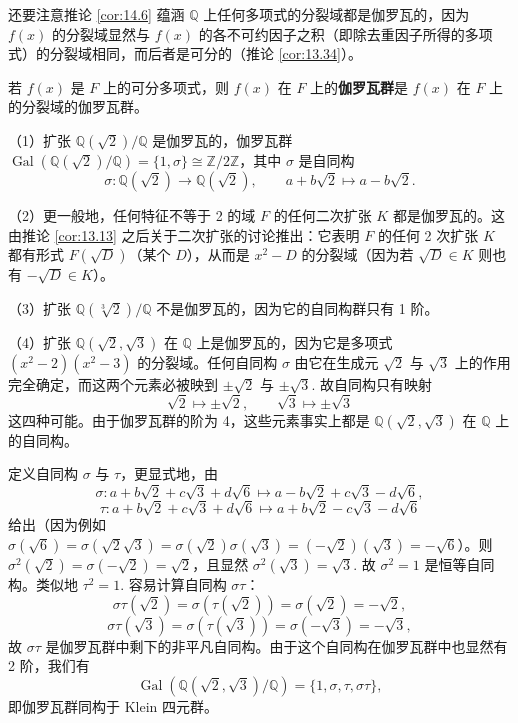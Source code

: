 还要注意推论 \ref{cor:14.6} 蕴涵 \(\mathbb{Q}\) 上任何多项式的分裂域都是伽罗瓦的，因为 \(f(x)\) 的分裂域显然与 \(f(x)\) 的各不可约因子之积（即除去重因子所得的多项式）的分裂域相同，而后者是可分的（推论 \ref{cor:13.34}）。

\begin{definition}
若 \(f(x)\) 是 \(F\) 上的可分多项式，则 \(f(x)\) 在 \(F\) 上的\textbf{伽罗瓦群}是 \(f(x)\) 在 \(F\) 上的分裂域的伽罗瓦群。
\end{definition}

\begin{example}
（1）扩张 \(\mathbb{Q}(\sqrt{2})/\mathbb{Q}\) 是伽罗瓦的，伽罗瓦群 \(\operatorname{Gal}(\mathbb{Q}(\sqrt{2})/\mathbb{Q}) = \{1, \sigma\} \cong \mathbb{Z}/2\mathbb{Z}\)，其中 \(\sigma\) 是自同构
\[
\sigma : \mathbb{Q}(\sqrt{2}) \to \mathbb{Q}(\sqrt{2}), \qquad a+b\sqrt{2} \mapsto a-b\sqrt{2}.
\]

（2）更一般地，任何特征不等于 2 的域 \(F\) 的任何二次扩张 \(K\) 都是伽罗瓦的。这由推论 \ref{cor:13.13} 之后关于二次扩张的讨论推出：它表明 \(F\) 的任何 2 次扩张 \(K\) 都有形式 \(F(\sqrt{D})\)（某个 \(D\)），从而是 \(x^2-D\) 的分裂域（因为若 \(\sqrt{D} \in K\) 则也有 \(-\sqrt{D} \in K\)）。

（3）扩张 \(\mathbb{Q}(\sqrt[3]{2})/\mathbb{Q}\) 不是伽罗瓦的，因为它的自同构群只有 1 阶。

（4）扩张 \(\mathbb{Q}(\sqrt{2}, \sqrt{3})\) 在 \(\mathbb{Q}\) 上是伽罗瓦的，因为它是多项式 \((x^2-2)(x^2-3)\) 的分裂域。任何自同构 \(\sigma\) 由它在生成元 \(\sqrt{2}\) 与 \(\sqrt{3}\) 上的作用完全确定，而这两个元素必被映到 \(\pm\sqrt{2}\) 与 \(\pm\sqrt{3}\). 故自同构只有映射
\[
\sqrt{2} \mapsto \pm\sqrt{2}, \qquad \sqrt{3} \mapsto \pm\sqrt{3}
\]
这四种可能。由于伽罗瓦群的阶为 4，这些元素事实上都是 \(\mathbb{Q}(\sqrt{2}, \sqrt{3})\) 在 \(\mathbb{Q}\) 上的自同构。

定义自同构 \(\sigma\) 与 \(\tau\)，更显式地，由
\[
\sigma : a+b\sqrt{2}+c\sqrt{3}+d\sqrt{6} \mapsto a-b\sqrt{2}+c\sqrt{3}-d\sqrt{6},
\]
\[
\tau : a+b\sqrt{2}+c\sqrt{3}+d\sqrt{6} \mapsto a+b\sqrt{2}-c\sqrt{3}-d\sqrt{6}
\]
给出（因为例如 \(\sigma(\sqrt{6}) = \sigma(\sqrt{2}\sqrt{3}) = \sigma(\sqrt{2})\sigma(\sqrt{3}) = (-\sqrt{2})(\sqrt{3}) = -\sqrt{6}\)）。则 \(\sigma^2(\sqrt{2}) = \sigma(-\sqrt{2}) = \sqrt{2}\)，且显然 \(\sigma^2(\sqrt{3}) = \sqrt{3}\). 故 \(\sigma^2 = 1\) 是恒等自同构。类似地 \(\tau^2 = 1\). 容易计算自同构 \(\sigma\tau\)：
\[
\sigma\tau(\sqrt{2}) = \sigma(\tau(\sqrt{2})) = \sigma(\sqrt{2}) = -\sqrt{2},
\]
\[
\sigma\tau(\sqrt{3}) = \sigma(\tau(\sqrt{3})) = \sigma(-\sqrt{3}) = -\sqrt{3},
\]
故 \(\sigma\tau\) 是伽罗瓦群中剩下的非平凡自同构。由于这个自同构在伽罗瓦群中也显然有 2 阶，我们有
\[
\operatorname{Gal}(\mathbb{Q}(\sqrt{2}, \sqrt{3})/\mathbb{Q}) = \{1, \sigma, \tau, \sigma\tau\},
\]
即伽罗瓦群同构于 Klein 四元群。


\end{example}

